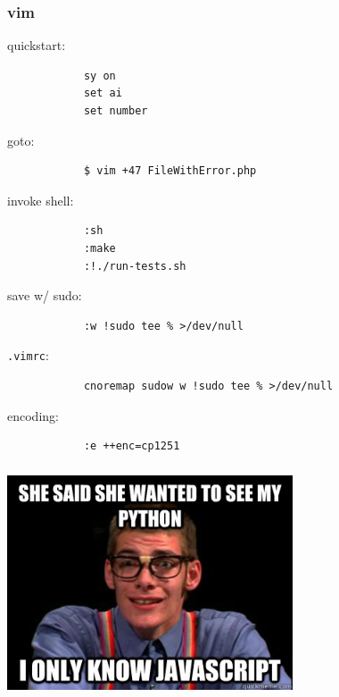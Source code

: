 \documentclass[hyperref={unicode=true}]{beamer}
\begin{document}
\begin{frame}[fragile]
	\frametitle{vim}
	quickstart:
	\begin{addmargin}[1em]{0em}
		\begin{verbatim}
			sy on
			set ai
			set number
		\end{verbatim}
	\end{addmargin}

	goto:
	\begin{addmargin}[1em]{0em}
		\begin{verbatim}
			$ vim +47 FileWithError.php
		\end{verbatim}
	\end{addmargin}

	invoke shell:
	\begin{addmargin}[1em]{0em}
		\begin{verbatim}
			:sh
			:make
			:!./run-tests.sh
		\end{verbatim}
	\end{addmargin}

	save w/ sudo:
	\begin{addmargin}[1em]{0em}
		\begin{verbatim}
			:w !sudo tee % >/dev/null
		\end{verbatim}
	\end{addmargin}

	\texttt{.vimrc}:
	\begin{addmargin}[1em]{0em}
		\begin{verbatim}
			cnoremap sudow w !sudo tee % >/dev/null
		\end{verbatim}
	\end{addmargin}

	encoding:
	\begin{addmargin}[1em]{0em}
		\begin{verbatim}
			:e ++enc=cp1251
		\end{verbatim}
	\end{addmargin}
\end{frame}

\begin{frame}[fragile]
	\frametitle{}
		\begin{center}
			\includegraphics[width=240pt]{python.jpg}
			\vspace{12pt}
		\end{center}
\end{frame}
\end{document}
